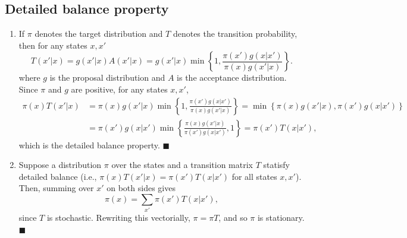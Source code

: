 \documentclass[11pt]{article}
\renewcommand{\qed}{\quad \ensuremath{\blacksquare}}
\begin{document}
\subsection{Detailed balance property}
\begin{enumerate}
\item If $\pi$ denotes the target distribution and $T$ denotes the transition
probability, then for any states $x,x'$
\[T(x'|x)
    = g(x'|x) A(x'|x)
    = g(x'|x) \min\left\{ 1, \frac{\pi(x')g(x|x')}{\pi(x)g(x'|x)} \right\}.
\]
where $g$ is the proposal distribution and $A$ is the acceptance distribution.
Since $\pi$ and $g$ are positive, for any states $x,x'$,
\begin{align*}
\pi(x)T(x'|x)
 &  = \pi(x) g(x'|x) \min\left\{ 1, \frac{\pi(x')g(x|x')}{\pi(x)g(x'|x)} \right\}
    = \min\left\{ \pi(x) g(x'|x), \pi(x')g(x|x') \right\}   \\
 &  = \pi(x')g(x|x') \min\left\{ \frac{\pi(x) g(x'|x)}{\pi(x')g(x|x')}, 1 \right\}
    = \pi(x')T(x|x'),
\end{align*}
which is the detailed balance property. \qed
\item Suppose a distribution $\pi$ over the states and a transition matrix $T$
statisfy detailed balance (i.e., $\pi(x)T(x'|x) = \pi(x')T(x|x')$ for all
states $x,x'$). Then, summing over $x'$ on both sides gives
\[\pi(x) = \sum_{x'} \pi(x')T(x|x'),\]
since $T$ is stochastic. Rewriting this vectorially, $\pi = \pi T$, and so
$\pi$ is stationary. \qed
\end{enumerate}

\newpage
\end{document}
